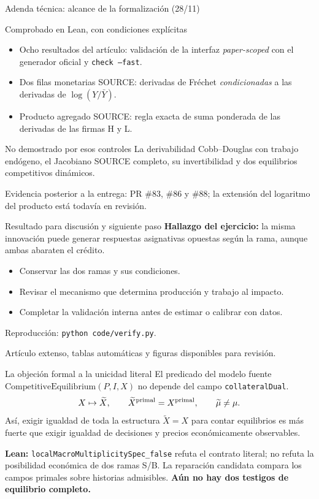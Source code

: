 \documentclass[aspectratio=169,11pt]{beamer}
\begin{document}
\begin{frame}{Adenda técnica: alcance de la formalización (28/11)}
\small
\begin{block}{Comprobado en Lean, con condiciones explícitas}
\begin{itemize}
\item Ocho resultados del artículo: validación de la interfaz
\emph{paper-scoped} con el generador oficial y \texttt{check --fast}.
\item Dos filas monetarias SOURCE: derivadas de Fréchet
\emph{condicionadas} a las derivadas de $\log(Y/\bar Y)$.
\item Producto agregado SOURCE: regla exacta de suma ponderada
de las derivadas de las firmas H y L.
\end{itemize}
\end{block}
\begin{alertblock}{No demostrado por esos controles}
La derivabilidad Cobb--Douglas con trabajo endógeno, el Jacobiano
SOURCE completo, su invertibilidad y dos equilibrios competitivos dinámicos.
\end{alertblock}
\footnotesize
Evidencia posterior a la entrega: PR \#83, \#86 y \#88;
la extensión del logaritmo del producto está todavía en revisión.
\end{frame}

\begin{frame}{Resultado para discusión y siguiente paso}
\textbf{Hallazgo del ejercicio:} la misma innovación puede generar respuestas
asignativas opuestas según la rama, aunque ambas abaraten el crédito.
\medskip
\begin{itemize}
\item Conservar las dos ramas y sus condiciones.
\item Revisar el mecanismo que determina producción y trabajo al impacto.
\item Completar la validación interna antes de estimar o calibrar con datos.
\end{itemize}
\medskip
Reproducción: \texttt{python code/verify.py}.
\par Artículo extenso, tablas automáticas y figuras disponibles para revisión.
\end{frame}

\begin{frame}{La objeción formal a la unicidad literal}
\small
El predicado del modelo fuente
$\mathrm{CompetitiveEquilibrium}(P,I,X)$ no depende
del campo \texttt{collateralDual}.
\[
X\mapsto\widetilde X,\qquad
\widetilde X^{\rm primal}=X^{\rm primal},\qquad
\widetilde\mu\neq\mu.
\]
Así, exigir igualdad de toda la estructura
$\widetilde X=X$ para contar equilibrios es
más fuerte que exigir igualdad de decisiones y
precios económicamente observables.
\medskip

\footnotesize
\textbf{Lean:}
\texttt{localMacroMultiplicitySpec\_false}
refuta el contrato literal; no refuta la posibilidad
económica de dos ramas S/B.
La reparación candidata compara los campos
primales sobre historias admisibles.
\textbf{Aún no hay dos testigos de equilibrio completo.}
\end{frame}
\end{document}
